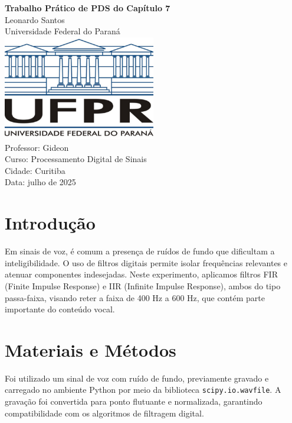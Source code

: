 \documentclass[a4paper,12pt]{article}
\begin{document}
	
	\begin{titlepage}
		\centering
		\vspace*{2cm}
		\Huge
		\textbf{Trabalho Prático de PDS do Capítulo 7} \\
		\vspace{1cm}
		\Large
		Leonardo Santos \\
		Universidade Federal do Paraná \\
		\vspace{0.5cm}
		\normalsize
		\vspace{2cm}
		\includegraphics[width=0.5\textwidth]{ufpr.png} \\
		\vspace{1cm}
		\large
		Professor: Gideon \\
		Curso: Processamento Digital de Sinais \\
		Cidade: Curitiba \\
		Data: julho de 2025 \\
	\end{titlepage}
	
	\section{Introdução}
	Em sinais de voz, é comum a presença de ruídos de fundo que dificultam a inteligibilidade. O uso de filtros digitais permite isolar frequências relevantes e atenuar componentes indesejadas. Neste experimento, aplicamos filtros FIR (Finite Impulse Response) e IIR (Infinite Impulse Response), ambos do tipo passa-faixa, visando reter a faixa de 400 Hz a 600 Hz, que contém parte importante do conteúdo vocal.
	
\section{Materiais e Métodos}

Foi utilizado um sinal de voz com ruído de fundo, previamente gravado e carregado no ambiente Python por meio da biblioteca \texttt{scipy.io.wavfile}. A gravação foi convertida para ponto flutuante e normalizada, garantindo compatibilidade com os algoritmos de filtragem digital.
\end{document}
